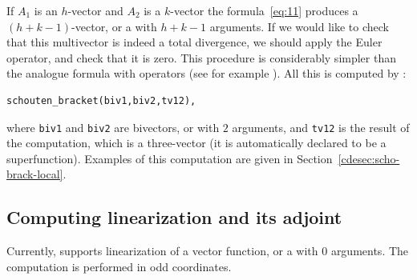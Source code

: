 If $A_1$ is an $h$-vector and $A_2$ is a $k$-vector the formula~\eqref{eq:11}
produces a $(h+k-1)$-vector, or a \cdiffop with $h+k-1$ arguments. If we would
like to check that this multivector is indeed a total divergence, we should
apply the Euler operator, and check that it is zero. This procedure is
considerably simpler than the analogue formula with operators (see for example
\cite{KerstenKrasilshchikVerboretsky:2004}). All this is computed by \cde:
\hypertarget{operator:SCHOUTEN_BRACKET}{}

\begin{verbatim}
schouten_bracket(biv1,biv2,tv12),
\end{verbatim}
where \texttt{biv1} and \texttt{biv2} are bivectors, or \cdiffops with $2$
arguments, and \texttt{tv12} is the result of the computation, which is a
three-vector (it is automatically declared to be a superfunction). Examples of
this computation are given in Section~\ref{cdesec:scho-brack-local}.

\subsection{Computing linearization and its adjoint}
\label{cdesec:linadj}

Currently, \cde supports linearization of a vector function, or a \cdiffop with
$0$ arguments. The computation is performed in odd coordinates.

